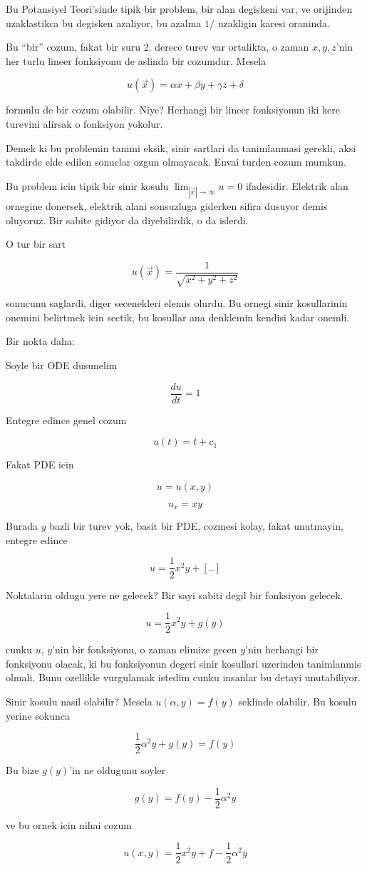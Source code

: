 \documentclass[12pt,fleqn]{article}
\begin{document}
Bu Potansiyel Teori'sinde tipik bir problem, bir alan degiskeni var, ve
orijinden uzaklastikca bu degisken azaliyor, bu azalma $1 / $ uzakligin
karesi oraninda. 

Bu ``bir'' cozum, fakat bir suru 2. derece turev var ortalikta, o zaman
$x,y,z$'nin her turlu lineer fonksiyonu de aslinda bir cozumdur. Mesela

\[ u(\vec{x}) = \alpha x + \beta y + \gamma z + \delta \]

formulu de bir cozum olabilir. Niye? Herhangi bir lineer fonksiyonun iki
kere turevini alirsak o fonksiyon yokolur. 

Demek ki bu problemin tanimi eksik, sinir sartlari da tanimlanmasi gerekli,
aksi takdirde elde edilen sonuclar ozgun olmayacak. Envai turden cozum
mumkun. 

Bu problem icin tipik bir sinir kosulu $\lim_{|\vec{x}|\to \infty} u = 0$
ifadesidir. Elektrik alan ornegine donersek, elektrik alani sonsuzluga
giderken sifira dusuyor demis oluyoruz. Bir sabite gidiyor da diyebilirdik,
o da islerdi. 

O tur bir sart 

\[ u(\vec{x}) = \frac{1}{\sqrt{x^2+y^2+z^2}} \]

sonucunu saglardi, diger secenekleri elemis olurdu. Bu ornegi sinir
kosullarinin onemini belirtmek icin sectik, bu kosullar ana denklemin
kendisi kadar onemli. 

Bir nokta daha:

Soyle bir ODE dusunelim

\[ \frac{du}{dt} = 1 \]

Entegre edince genel cozum

\[ u(t) = t + c_1 \]

Fakat PDE icin

\[ u = u(x,y) \]

\[ u_x = xy \]

Burada $y$ bazli bir turev yok, basit bir PDE, cozmesi kolay, fakat
unutmayin, entegre edince

\[ u = \frac{1}{2}x^2y + [..] \]

Noktalarin oldugu yere ne gelecek? Bir sayi sabiti degil bir fonksiyon
gelecek. 

\[ u = \frac{1}{2}x^2y + g(y) \]

cunku $u$, $y$'nin bir fonksiyonu, o zaman elimize gecen $y$'nin herhangi
bir fonksiyonu olacak, ki bu fonksiyonun degeri sinir kosullari uzerinden
tanimlanmis olmali. Bunu ozellikle vurgulamak istedim cunku insanlar bu
detayi unutabiliyor.

Sinir kosulu nasil olabilir? Mesela $u(\alpha,y) = f(y)$ seklinde
olabilir. Bu kosulu yerine sokunca

\[ \frac{1}{2}\alpha^2 y + g(y) = f(y) \]

Bu bize $g(y)$'in ne oldugunu soyler

\[ g(y)  = f(y) - \frac{1}{2}\alpha^2 y \]

ve bu ornek icin nihai cozum

\[ u(x,y) = \frac{1}{2}x^2y + f - \frac{1}{2}\alpha^2 y \]
\end{document}
